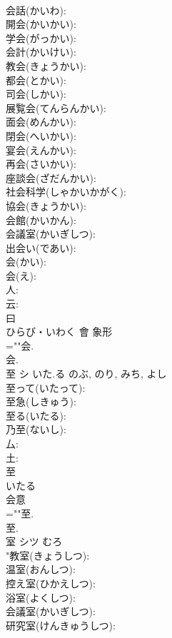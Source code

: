 \documentclass[8pt]{extreport}
\begin{document}
\begin{CJK}{UTF8}{min}
\\	会話(かいわ): 
\\	開会(かいかい): 
\\	学会(がっかい): 
\\	会計(かいけい): 
\\	教会(きょうかい): 
\\	都会(とかい): 
\\	司会(しかい): 
\\	展覧会(てんらんかい): 
\\	面会(めんかい): 
\\	閉会(へいかい): 
\\	宴会(えんかい): 
\\	再会(さいかい): 
\\	座談会(ざだんかい): 
\\	社会科学(しゃかいかがく): 
\\	協会(きょうかい): 
\\	会館(かいかん): 
\\	会議室(かいぎしつ): 
\\	出会い(であい): 
\\	会(かい): 
\\	会(え): 
\\	人: 
\\	云: 
\\	曰	
\\	ひらび・いわく	會	象形 
\\	=""会.
\\	会.
\\	至	シ	いた.る	のぶ, のり, みち, よし	
\\	至って(いたって): 
\\	至急(しきゅう): 
\\	至る(いたる): 
\\	乃至(ないし): 
\\	厶: 
\\	土: 
\\	至	
\\	いたる	
\\	会意 
\\	=""至.
\\	至.
\\	室	シツ	むろ		
\\	"教室(きょうしつ): 
\\	温室(おんしつ): 
\\	控え室(ひかえしつ): 
\\	浴室(よくしつ): 
\\	会議室(かいぎしつ): 
\\	研究室(けんきゅうしつ): 

\end{CJK}
\end{document}
